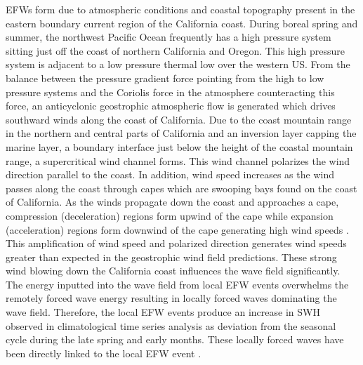 \documentclass[draft,linenumbers]{agujournal2018}
\begin{document}
EFWs form due to atmospheric conditions and coastal topography present in the eastern boundary current region of the California coast. During boreal spring and summer, the northwest Pacific Ocean frequently has a high pressure system sitting just off the coast of northern California and Oregon. This high pressure system is adjacent to a low pressure thermal low over the western US. From the balance between the pressure gradient force pointing from the high to low pressure systems and the Coriolis force in the atmosphere counteracting this force, an anticyclonic geostrophic atmospheric flow is generated which drives southward winds along the coast of California. Due to the coast mountain range in the northern and central parts of California and an inversion layer capping the marine layer, a boundary interface just below the height of the coastal mountain range, a supercritical wind channel forms. This wind channel polarizes the wind direction parallel to the coast. In addition, wind speed increases as the wind passes along the coast through capes which are swooping bays found on the coast of California. As the winds propagate down the coast and approaches a cape, compression (deceleration) regions form upwind of the cape while expansion (acceleration) regions form downwind of the cape generating high wind speeds \citealp{winant1988marine,taylor2008northerly}. This amplification of wind speed and polarized direction generates wind speeds greater than expected in the geostrophic wind field predictions. These strong wind blowing down the California coast influences the wave field significantly. The energy inputted into the wave field from local EFW events overwhelms the remotely forced wave energy resulting in locally forced waves dominating the wave field. Therefore, the local EFW events produce an increase in SWH observed in climatological time series analysis as deviation from the seasonal cycle during the late spring and early months. These locally forced waves have been directly linked to the local EFW event \cite{villas2017characterization}.


\end{document}
